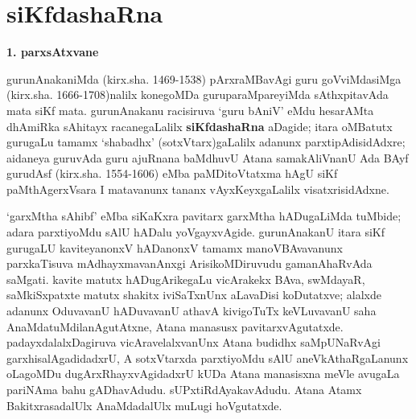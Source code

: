 \makeatletter
\def\@makechapterhead#1{%
  \vspace*{10\p@}%
{\fontsize{13pt}{13pt}\selectfont\raggedright{\bf  BeY joVdf siMgf}\par}
\vspace*{25\p@}%
  {\parindent \z@ \centering \normalfont
    \ifnum \c@secnumdepth >\m@ne
      \if@mainmatter
        {\huge\bfseries  #1}\par\nobreak
	\vskip 4pt
      \fi
    \fi
\smallskip 

 \vskip 10\p@  
{\fontsize{12pt}{12pt}\selectfont\raggedleft{anu: \bf pu.ti.na.}\par}
  }
\vskip 40\p@}
\makeatother


\chapter{siKfdashaRna}\label{chap007}

\begin{center}
{\Large\bf 1. parxsAtxvane}
\end{center}

gurunAnakaniMda (kirx.sha. {\rm 1469-1538}) pArxraMBavAgi guru goVviMdasiMga (kirx.sha. {\rm 1666-1708})nalilx konegoMDa guruparaMpareyiMda sAthxpitavAda mata siKf mata. gurunAnakanu racisiruva `guru bAniV' eMdu hesarAMta dhAmiRka sAhitayx racanegaLalilx {\bf siKfdashaRna} aDagide; itara oMBatutx gurugaLu tamamx `shabadhx' (sotxVtarx)gaLalilx adanunx parxtipAdisidAdxre; aidaneya guruvAda guru ajuRnana baMdhuvU Atana samakAliVnanU Ada BAyf gurudAsf (kirx.sha. {\rm 1554-1606}) eMba paMDitoVtatxma hAgU siKf paMthAgerxVsara I matavanunx tananx vAyxKeyxgaLalilx visatxrisidAdxne.

`garxMtha sAhibf' eMba siKaKxra pavitarx garxMtha hADugaLiMda tuMbide; adara parxti\-yoMdu sAlU hADalu yoVgayxvAgide. gurunAnakanU itara siKf gurugaLU kaviteyanonxV hADanonxV tamamx manoVBAvavanunx parxkaTisuva mAdhayxma\-vanAnxgi Arisi\-koMDiruvudu gamanAhaRvAda saMgati. kavite matutx hADugArikegaLu vicArakekx BAva, swMdayaR, saMkiSxpatxte matutx shakitx iviSaTxnUnx aLavaDisi koDutatxve; alalxde adanunx OduvavanU hADuvavanU athavA kivigoTuTx keVLuvavanU saha AnaMdatuMdila\-nAgutAtxne, Atana manasusx pavitarxvAgutatxde. padayxdalalxDagiruva vicAravelalxvanUnx Atana budidhx saMpUNaRvAgi garxhisalAgadidadxrU, A sotxVtarxda parxtiyoMdu sAlU aneVkAthaRgaLanunx oLagoMDu dugArxRhayxvAgidadxrU kUDa Atana manasisxna meVle avugaLa pari\-NAma bahu gADhavAdudu. sUPxtiRdAyakavAdudu. Atana Atamx BakitxrasadalUlx AnaMda\-dalUlx muLugi hoVgutatxde.

